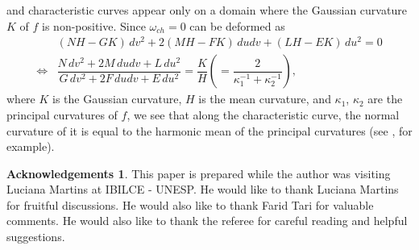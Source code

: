 \documentclass[a4paper, 12pt]{article}
\theoremstyle{definition}
\newtheorem*{acknowledgements}{Acknowledgements}
\numberwithin{equation}{section}
\begin{document}
and 
characteristic curves appear only on 
a domain where the Gaussian curvature $K$ of $f$ is non-positive.
Since $\omega_{ch}=0$ can be deformed as
$$
\begin{array}{cl}
&(NH-GK)\,dv^2+2(MH-FK)\,dudv+(LH-EK)\,du^2=0\\[2mm]
\Leftrightarrow&
\dfrac{N\,dv^2+2M\,dudv+L\,du^2}
{G\,dv^2+2F\,dudv+E\,du^2}=\dfrac{K}{H}
\left(=
\dfrac{2}{\kappa_1^{-1}+\kappa_2^{-1}}\right),
\end{array}
$$
where $K$ is the Gaussian curvature, $H$ is
the mean curvature, and $\kappa_1$, $\kappa_2$ are
the principal curvatures of $f$,
we see that
along the characteristic curve, the
normal curvature of it is equal to the harmonic
mean of the principal curvatures
(see \cite{gs}, for example).

\begin{acknowledgements}
This paper is prepared while the author was visiting
Luciana Martins 
at IBILCE - UNESP.
He would like to thank Luciana Martins for fruitful
discussions.
He would also like to thank Farid Tari for
valuable comments.
He would also like to thank the
referee for careful reading and helpful suggestions.
\end{acknowledgements}
\end{document}

